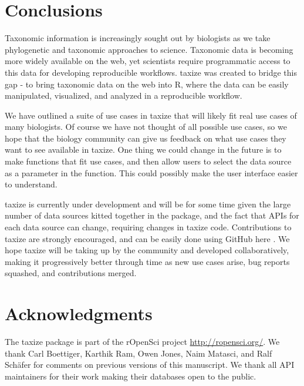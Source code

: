 \documentclass[10pt]{article}\usepackage[]{graphicx}\usepackage[]{color}
\begin{document}
\section*{Conclusions}
Taxonomic information is increasingly sought out by biologists as we take phylogenetic and taxonomic approaches to science. Taxonomic data is becoming more widely available on the web, yet scientists require programmatic access to this data for developing reproducible workflows. taxize was created to bridge this gap - to bring taxonomic data on the web into R, where the data can be easily manipulated, visualized, and analyzed in a reproducible workflow.

We have outlined a suite of use cases in taxize that will likely fit real use cases of many biologists. Of course we have not thought of all possible use cases, so we hope that the biology community can give us feedback on what use cases they want to see available in taxize. One thing we could change in the future is to make functions that fit use cases, and then allow users to select the data source as a parameter in the function. This could possibly make the user interface easier to understand.

taxize is currently under development and will be for some time given the large number of data sources kitted together in the package, and the fact that APIs for each data source can change, requiring changes in taxize code. Contributions to taxize are strongly encouraged, and can be easily done using GitHub here \cite{github_taxize}. We hope taxize will be taking up by the community and developed collaboratively, making it progressively better through time as new use cases arise, bug reports squashed, and contributions merged.


\section*{Acknowledgments}
The taxize package is part of the rOpenSci project \url{http://ropensci.org/}. We thank Carl Boettiger, Karthik Ram, Owen Jones, Naim Matasci, and Ralf Sch\"{a}fer for comments on previous versions of this manuscript. We thank all API maintainers for their work making their databases open to the public.


\end{document}
